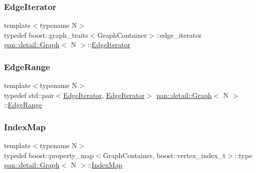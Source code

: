 \mbox{\label{classpan_1_1detail_1_1_graph_abf1033eeaf577f4c099f3e56164a0439}} 
\subsubsection{\texorpdfstring{Edge\+Iterator}{EdgeIterator}}
{\footnotesize\ttfamily template$<$typename N$>$ \\
typedef boost\+::graph\+\_\+traits$<$Graph\+Container$>$\+::edge\+\_\+iterator \hyperlink{classpan_1_1detail_1_1_graph}{pan\+::detail\+::\+Graph}$<$ N $>$\+::\hyperlink{classpan_1_1detail_1_1_graph_abf1033eeaf577f4c099f3e56164a0439}{Edge\+Iterator}}

\mbox{\label{classpan_1_1detail_1_1_graph_af7c5ed956d483a3bf26469b7698f5689}} 
\subsubsection{\texorpdfstring{Edge\+Range}{EdgeRange}}
{\footnotesize\ttfamily template$<$typename N$>$ \\
typedef std\+::pair$<$\hyperlink{classpan_1_1detail_1_1_graph_abf1033eeaf577f4c099f3e56164a0439}{Edge\+Iterator}, \hyperlink{classpan_1_1detail_1_1_graph_abf1033eeaf577f4c099f3e56164a0439}{Edge\+Iterator}$>$ \hyperlink{classpan_1_1detail_1_1_graph}{pan\+::detail\+::\+Graph}$<$ N $>$\+::\hyperlink{classpan_1_1detail_1_1_graph_af7c5ed956d483a3bf26469b7698f5689}{Edge\+Range}}

\mbox{\label{classpan_1_1detail_1_1_graph_a5c24f583c13faceb000758f24389728c}} 
\subsubsection{\texorpdfstring{Index\+Map}{IndexMap}}
{\footnotesize\ttfamily template$<$typename N$>$ \\
typedef boost\+::property\+\_\+map$<$Graph\+Container, boost\+::vertex\+\_\+index\+\_\+t$>$\+::type \hyperlink{classpan_1_1detail_1_1_graph}{pan\+::detail\+::\+Graph}$<$ N $>$\+::\hyperlink{classpan_1_1detail_1_1_graph_a5c24f583c13faceb000758f24389728c}{Index\+Map}}

